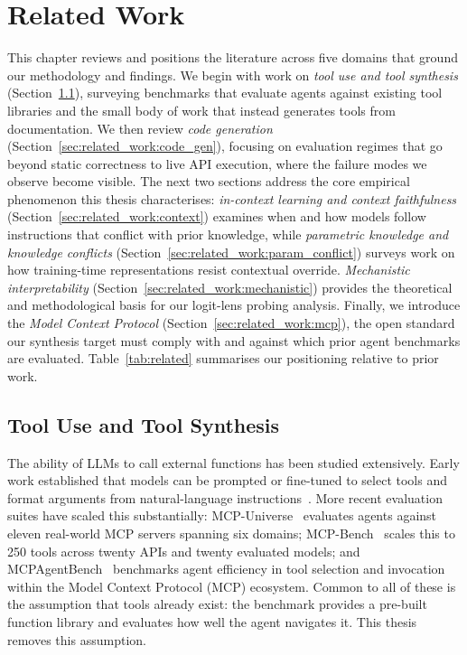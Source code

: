 \chapter{Related Work}
\label{sec:related_work}

This chapter reviews and positions the literature across five domains that ground our methodology and findings. We begin with work on \textit{tool use and tool synthesis} (Section~\ref{sec:related_work:tools}), surveying benchmarks that evaluate agents against existing tool libraries and the small body of work that instead generates tools from documentation. We then review \textit{code generation} (Section~\ref{sec:related_work:code_gen}), focusing on evaluation regimes that go beyond static correctness to live API execution, where the failure modes we observe become visible. The next two sections address the core empirical phenomenon this thesis characterises: \textit{in-context learning and context faithfulness} (Section~\ref{sec:related_work:context}) examines when and how models follow instructions that conflict with prior knowledge, while \textit{parametric knowledge and knowledge conflicts} (Section~\ref{sec:related_work:param_conflict}) surveys work on how training-time representations resist contextual override. \textit{Mechanistic interpretability} (Section~\ref{sec:related_work:mechanistic}) provides the theoretical and methodological basis for our logit-lens probing analysis. Finally, we introduce the \textit{Model Context Protocol} (Section~\ref{sec:related_work:mcp}), the open standard our synthesis target must comply with and against which prior agent benchmarks are evaluated. Table~\ref{tab:related} summarises our positioning relative to prior work.

\section{Tool Use and Tool Synthesis}
\label{sec:related_work:tools}
The ability of LLMs to call external functions has been studied extensively. Early work established that models can be prompted or fine-tuned to select tools and format arguments from natural-language instructions~\citep{schick2023toolformer,qin2023toolbench,li2023apibank}. More recent evaluation suites have scaled this substantially: MCP-Universe~\citep{mcpuniverse2025} evaluates agents against eleven real-world MCP servers spanning six domains; MCP-Bench~\citep{mcpbench2025} scales this to 250 tools across twenty APIs and twenty evaluated models; and MCPAgentBench~\citep{mcpagentbench2024} benchmarks agent efficiency in tool selection and invocation within the Model Context Protocol (MCP) ecosystem. Common to all of these is the assumption that tools already exist: the benchmark provides a pre-built function library and evaluates how well the agent navigates it. This thesis removes this assumption.

